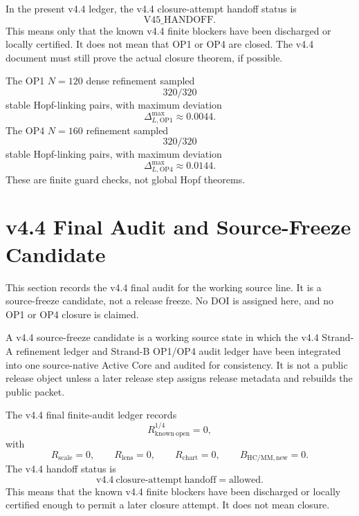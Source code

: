 \begin{theorem}
In the present v4.4 ledger, the v4.4 closure-attempt handoff status is
\[
    \mathrm{V45\_HANDOFF}.
\]
This means only that the known v4.4 finite blockers have been discharged or
locally certified.  It does not mean that OP1 or OP4 are closed.  The v4.4
document must still prove the actual closure theorem, if possible.
\end{theorem}

\begin{remark}
The OP1 \(N=120\) dense refinement sampled
\[
    320/320
\]
stable Hopf-linking pairs, with maximum deviation
\[
    \Delta_{L,\mathrm{OP1}}^{\max}\approx 0.0044.
\]
The OP4 \(N=160\) refinement sampled
\[
    320/320
\]
stable Hopf-linking pairs, with maximum deviation
\[
    \Delta_{L,\mathrm{OP4}}^{\max}\approx 0.0144.
\]
These are finite guard checks, not global Hopf theorems.
\end{remark}



\section{v4.4 Final Audit and Source-Freeze Candidate}
\label{sec:v44-final-audit-source-freeze-candidate}

This section records the v4.4 final audit for the working source line.  It is a
source-freeze candidate, not a release freeze.  No DOI is assigned here, and no
OP1 or OP4 closure is claimed.

\begin{definition}
A v4.4 source-freeze candidate is a working source state in which the v4.4
Strand-A refinement ledger and Strand-B OP1/OP4 audit ledger have been
integrated into one source-native Active Core and audited for consistency.  It
is not a public release object unless a later release step assigns release
metadata and rebuilds the public packet.
\end{definition}

\begin{proposition}
The v4.4 final finite-audit ledger records
\[
    R_{\mathrm{known\ open}}^{1/4}=0,
\]
with
\[
    R_{\mathrm{scale}}=0,\qquad
    R_{\mathrm{lens}}=0,\qquad
    R_{\mathrm{chart}}=0,\qquad
    B_{\mathrm{HC/MM,new}}=0.
\]
The v4.4 handoff status is
\[
    \mathrm{v4.4\ closure\text{-}attempt\ handoff}=\mathrm{allowed}.
\]
This means that the known v4.4 finite blockers have been discharged or locally
certified enough to permit a later closure attempt.  It does not mean closure.
\end{proposition}

